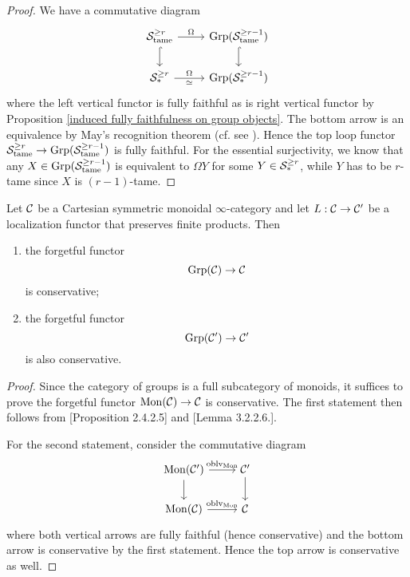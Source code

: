 \begin{proof}
	We have a commutative diagram 
	\[
	\begin{tikzcd}
		\CS^{\geq r}_{\tame} & \Grp(\CS^{\geq r-1}_{\tame})\\
		\CS^{\geq r}_*   &  \Grp(\CS^{\geq r-1}_{*})  	
	\arrow[from=1-1, to=1-2,"\Omega"]
	\arrow[from=2-1, to=2-2, "\Omega","\simeq" below]
	\arrow[hook, from=1-1, to=2-1]
	\arrow[hook, from=1-2, to=2-2]
	\end{tikzcd}
	\]
	where the left vertical functor is fully faithful as is right vertical functor by Proposition \ref{induced fully faithfulness on group objects}. The bottom arrow is an equivalence by May's recognition theorem (cf. see \cite[Theorem 5.2.6.10.]{HA}). Hence the top loop functor ${\mathcal{S}}^{\geq r}_{\operatorname{\operatorname{tame}}} \to \operatorname{Grp}({\mathcal{S}}^{\geq r-1}_{\operatorname{\operatorname{tame}}})$ is fully faithful.
	For the essential surjectivity, we know that any $X\in \operatorname{Grp}({\mathcal{S}}^{\geq r-1}_{\operatorname{\operatorname{tame}}})$ is equivalent to $\Omega Y$ for some $Y\in {\mathcal{S}}^{\geq r}_*$, while $Y$ has to be $r$-tame since $X$ is $(r-1)$-tame.
	
\end{proof}

\begin{lemma}
\label{conservativity of forgetful functor (general)}
	Let ${\mathcal{C}}$ be a Cartesian symmetric monoidal $\infty$-category and let $L:{\mathcal{C}}\to {\mathcal{C}}'$ be a localization functor that preserves finite products.
	Then 
	\begin{enumerate}
		\item the forgetful functor
	\[
	\operatorname{Grp}({\mathcal{C}})\to {\mathcal{C}}
	\]
	is conservative;
	\item the forgetful functor
	\[
	\operatorname{Grp}({\mathcal{C}}')\to {\mathcal{C}}'
	\]
	is also conservative.
	\end{enumerate}
\end{lemma}
\begin{proof}
	Since the category of groups is a full subcategory of monoids, it suffices to prove the forgetful functor $\operatorname{Mon}({\mathcal{C}})\to {\mathcal{C}}$ is conservative.
	The first statement then follows from \cite{HA}[Proposition 2.4.2.5] and \cite{HA}[Lemma 3.2.2.6.].
	
	For the second statement, consider the commutative diagram
	\[
\begin{tikzcd}
	\Mon(\CC') & \CC'\\
	\Mon(\CC) & 
	\CC	
	\arrow[from=1-1, to= 1-2, "\oblv_{\Mon}"]
	\arrow[from=1-1, to=2-1]
	\arrow[from=1-2, to=2-2]
	\arrow[from=2-1, to= 2-2, "\oblv_{\Mon}"]
\end{tikzcd}
\]
where both vertical arrows are fully faithful (hence conservative) and the bottom arrow is conservative by the first statement. Hence the top arrow is conservative as well.
\end{proof}

